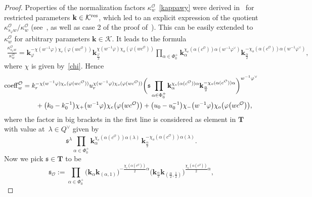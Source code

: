 \documentclass[11pt]{article}
\numberwithin{equation}{section}
\numberwithin{equation}{section}
\begin{document}
\begin{proof}
Properties of the normalization factors $\kappa_w^\mathcal{O}$~\eqref{kappawy}
were derived in~\cite{SSV2} for restricted parameters $\mathbf{k}\in\mathcal{K}^{{\rm res}}$, which led to an explicit expression of the quotient $\kappa_{s_\varphi w}^\mathcal{O}/\kappa_w^\mathcal{O}$ (see~\cite[Lemma 5.6\,(1)]{SSV2}, as well as case 2 of the proof of~\cite[Lemma 5.9]{SSV2}).
This can be easily extended to $\kappa_w^\mathcal{O}$ for arbitrary parameters $\mathbf{k}\in\mathcal{K}$. It leads to the formula
\begin{gather*}
\frac{\kappa_{s_\varphi w}^\mathcal{O}}{\kappa_w^\mathcal{O}}=\mathbf{k}_\varphi^{-\chi(w^{-1}\varphi)\chi_e(\varphi(wc^\mathcal{O}))}
\mathbf{k}_{\frac{\varphi}{2}}^{\chi(w^{-1}\varphi)\chi_o(\varphi(wc^\mathcal{O}))}
\prod_{\alpha\in\Phi_0^+}\mathbf{k}_\alpha^{\chi_e(\alpha(c^\mathcal{O}))\alpha(w^{-1}\varphi^\vee)}\mathbf{k}_{\frac{\alpha}{2}}^{-\chi_o(\alpha(c^\mathcal{O}))\alpha(w^{-1}\varphi^\vee)},
\end{gather*}
where $\chi$ is given by~\eqref{chi}. Hence
\begin{gather*}
{\rm coeff}_w^\mathcal{O}=k_r^{-\chi(w^{-1}\varphi)\chi_e(\varphi(wc^\mathcal{O}))}u_r^{\chi(w^{-1}\varphi)\chi_o(\varphi(wc^\mathcal{O}))}
\biggl(\mathfrak{s}\prod_{\alpha\in\Phi_0^+}\mathbf{k}_\alpha^{\chi_e(\alpha(c^\mathcal{O}))\alpha} \mathbf{k}_{\frac{\alpha}{2}}^{-\chi_o(\alpha(c^\mathcal{O}))\alpha}\biggr)^{w^{-1}\varphi^\vee}\\
\hphantom{{\rm coeff}_w^\mathcal{O}=}{}
+\bigl(k_0-k_0^{-1}\bigr)\chi_+\bigl(w^{-1}\varphi\bigr)\chi_e\bigl(\varphi\bigl(wc^\mathcal{O}\bigr)\bigr)+
\bigl(u_0-u_0^{-1}\bigr)\chi_-\bigl(w^{-1}\varphi\bigr)\chi_o\bigl(\varphi\bigl(wc^\mathcal{O}\bigr)\bigr),
\end{gather*}
where the factor in big brackets in the first line is considered as element in $\mathbf{T}$ with value at~${\lambda\in Q^\vee}$ given by
\[
\mathfrak{s}^\lambda\prod_{\alpha\in\Phi_0^+}\mathbf{k}_\alpha^{\chi_e(\alpha(c^\mathcal{O}))\alpha(\lambda)}\,\mathbf{k}_{\frac{\alpha}{2}}^{-\chi_o(\alpha(c^\mathcal{O}))\alpha(\lambda)}.
\]
Now we pick $\mathfrak{s}\in\mathbf{T}$ to be
\begin{equation}\label{s}
\mathfrak{s}_\mathcal{O}:=\prod_{\alpha\in\Phi_0^+}\bigl(\mathbf{k}_{\alpha}\mathbf{k}_{(\alpha,1)}\bigr)^{-\frac{\chi_e(\alpha(c^\mathcal{O}))}{2}\alpha}
\bigl(\mathbf{k}_{\frac{\alpha}{2}}\mathbf{k}_{(\frac{\alpha}{2},\frac{1}{2})}\bigr)^{\frac{\chi_o(\alpha(c^\mathcal{O}))}{2}\alpha},
\end{equation}

\end{proof}
\end{document}
